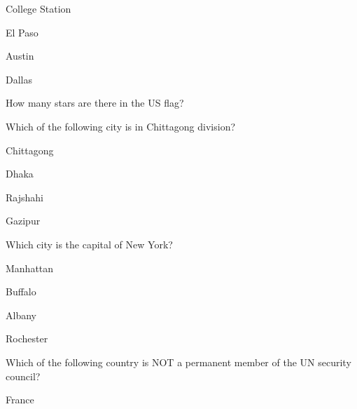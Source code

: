 \documentclass[12pt]{exam}
\begin{document}
\begin{questions}
\begin{oneparchoices}
            \choice College Station
        
            \choice El Paso
        
            \choice Austin
        
            \choice Dallas
        
        \end{oneparchoices}

    \question How many stars are there in the US flag?
    
        \begin{oneparchoices}
        
        
        
        
        
        \end{oneparchoices}

    \question Which of the following city is in Chittagong division?
    
        \begin{oneparchoices}
        
            \choice Chittagong
        
            \choice Dhaka
        
            \choice Rajshahi
        
            \choice Gazipur
        
        \end{oneparchoices}

    \question Which city is the capital of New York?
    
        \begin{oneparchoices}
        
            \choice Manhattan
        
            \choice Buffalo
        
            \choice Albany
        
            \choice Rochester
        
        \end{oneparchoices}

    \question Which of the following country is NOT a permanent member of the 
        UN security council?
    
        \begin{oneparchoices}
        
            \choice France
        

\end{oneparchoices}
\end{questions}
\end{document}

